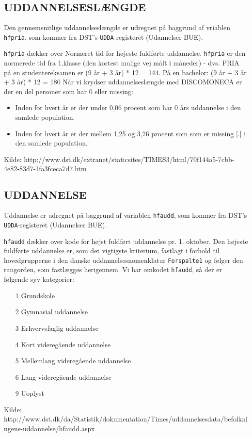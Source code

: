 \subsection{UDDANNELSESLÆNGDE \label{}}

Den gennemsnitlige uddannelseslængde er udregnet på baggrund af vriablen \texttt{hfpria}, som kommer fra DST's \texttt{UDDA}-registeret (Udannelser BUE).

\texttt{hfpria} dækker over Normeret tid for højeste fuldførte uddannelse. \texttt{hfpria} er den normerede tid fra 1.klasse (den kortest mulige vej målt i måneder) - dvs. PRIA på en studentereksamen er (9 år + 3 år) * 12 = 144. På en bachelor: (9 år + 3 år + 3 år) * 12 = 180
%
Når vi krydser uddannelseslængde med DISCOMONECA er der en del personer som har 0 eller missing:
% 
\begin{itemize} [topsep=6pt,itemsep=-1ex]
  \item Inden for hvert år er der under 0,06 procent som har 0 års uddannelse i den samlede population.
  \item Inden for hvert år er der mellem 1,25 og 3,76 procent som som er missing [.] i den samlede population.
\end{itemize}
%
Kilde: http://www.dst.dk/extranet/staticsites/TIMES3/html/70f144a5-7cbb-4e82-83d7-1fa3fceca7d7.htm


\subsection{UDDANNELSE \label{}}

Uddannelse er udregnet på baggrund af variablen \texttt{hfaudd}, som kommer fra DST's \texttt{UDDA}-registeret (Udannelser BUE).

\texttt{hfaudd} dækker over kode for højst fuldført uddannelse pr. 1. oktober. Den højeste fuldførte uddannelse er, som det vigtigste kriterium, fastlagt i forhold til hovedgrupperne i den danske uddannelsesnomenklatur \texttt{Forspalte1} og følger den rangorden, som fastlægges herigennem.
%
Vi har omkodet \texttt{hfaudd}, så der er følgende syv kategorier:
% 
\begin{enumerate} [topsep=6pt,itemsep=-1ex]
  \item [1] Grundskole
  \item [2] Gymnasial uddannelse
  \item [3] Erhvervsfaglig uddannelse
  \item [4] Kort videregående uddannelse
  \item [5] Mellemlang videregående uddannelse
  \item [6] Lang videregående uddannelse
  \item [9] Uoplyst
\end{enumerate}
%
Kilde: http://www.dst.dk/da/Statistik/dokumentation/Times/uddannelsesdata/befolkningens-uddannelse/hfaudd.aspx


